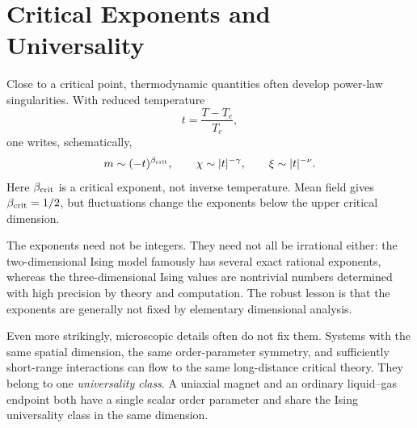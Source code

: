 \section{Critical Exponents and Universality}

Close to a critical point, thermodynamic quantities often develop power-law singularities. With reduced temperature
\begin{equation}
t=\frac{T-T_c}{T_c},
\end{equation}
one writes, schematically,
\begin{equation}
m\sim(-t)^{\beta_{\rm crit}},
\qquad
\chi\sim |t|^{-\gamma},
\qquad
\xi\sim |t|^{-\nu}.
\label{eq:critical-exponents}
\end{equation}
Here \(\beta_{\rm crit}\) is a critical exponent, not inverse temperature. Mean field gives \(\beta_{\rm crit}=1/2\), but fluctuations change the exponents below the upper critical dimension.

The exponents need not be integers. They need not all be irrational either: the two-dimensional Ising model famously has several exact rational exponents, whereas the three-dimensional Ising values are nontrivial numbers determined with high precision by theory and computation. The robust lesson is that the exponents are generally not fixed by elementary dimensional analysis.

Even more strikingly, microscopic details often do not fix them. Systems with the same spatial dimension, the same order-parameter symmetry, and sufficiently short-range interactions can flow to the same long-distance critical theory. They belong to one \emph{universality class}. A uniaxial magnet and an ordinary liquid--gas endpoint both have a single scalar order parameter and share the Ising universality class in the same dimension.

\begin{classroomqa}
\end{classroomqa}

\begin{classroomqa}
\end{classroomqa}


